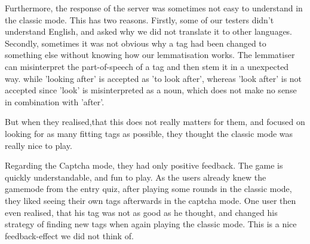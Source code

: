 Furthermore, the response of the server was sometimes not easy to understand in the classic mode.
This has two reasons.
Firstly, some of our testers didn't understand English, and asked why we did not translate it to other languages. 
Secondly, sometimes it was not obvious why a tag had been changed to something else without knowing how our lemmatisation works.
The lemmatiser can misinterpret the part-of-speech of a tag and then stem it in a unexpected way.
while 'looking after' is accepted as 'to look after', whereas 'look after' is not accepted since 'look' is misinterpreted as a noun, which does not make no sense in combination with 'after'.

But when they realised,that this does not really matters for them, and focused on looking for as many fitting tags as possible, they thought the classic mode was really nice to play.

Regarding the Captcha mode, they had only positive feedback. The game is quickly understandable, and fun to play.
As the users already knew the gamemode from the entry quiz, after playing some rounds in the classic mode, they liked seeing their own tags afterwards in the captcha mode.
One user then even realised, that his tag was not as good as he thought, and changed his strategy of finding new tags when again playing the classic mode.
This is a nice feedback-effect we did not think of.